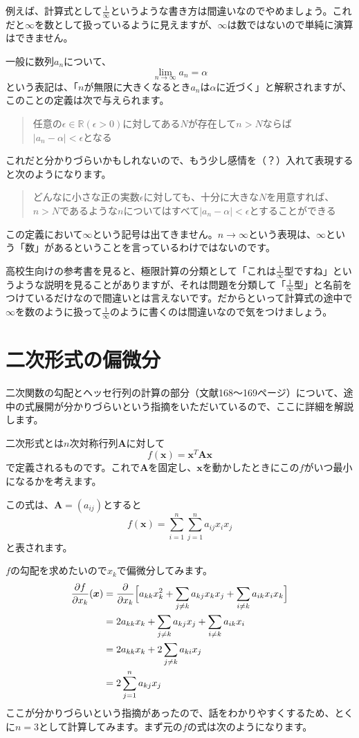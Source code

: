 \documentclass[11pt]{article}
\begin{document}
例えば、計算式として$\frac{1}{\infty}$というような書き方は間違いなのでやめましょう。これだと$\infty$を数として扱っているように見えますが、$\infty$は数ではないので単純に演算はできません。

一般に数列$a_n$について、
\[
\lim_{n\to \infty} a_n = \alpha
\]
という表記は、「$n$が無限に大きくなるとき$a_n$は$\alpha$に近づく」と解釈されますが、このことの定義は次で与えられます。

\begin{quote}
  任意の$\epsilon \in \mathbb{R}(\epsilon >0)$に対してある$N$が存在して$n>N$ならば\\$|a_n - \alpha|<\epsilon$となる
\end{quote}

これだと分かりづらいかもしれないので、もう少し感情を（？）入れて表現すると次のようになります。
\begin{quote}
  どんなに小さな正の実数$\epsilon$に対しても、十分に大きな$N$を用意すれば、$n>N$であるような$n$についてはすべて$|a_n - \alpha|<\epsilon$とすることができる
\end{quote}

この定義において$\infty$という記号は出てきません。$n\to \infty$という表現は、$\infty$という「数」があるということを言っているわけではないのです。

高校生向けの参考書を見ると、極限計算の分類として「これは$\frac{1}{\infty}$型ですね」というような説明を見ることがありますが、それは問題を分類して「$\frac{1}{\infty}$型」と名前をつけているだけなので間違いとは言えないです。だからといって計算式の途中で$\infty$を数のように扱って$\frac{1}{\infty}$のように書くのは間違いなので気をつけましょう。

\section{二次形式の偏微分}

二次関数の勾配とヘッセ行列の計算の部分（文献\cite{mle}168〜169ページ）について、途中の式展開が分かりづらいという指摘をいただいているので、ここに詳細を解説します。

二次形式とは$n$次対称行列$\bm{A}$に対して
\[
f(\bm{x})=\bm{x}^T \bm{A} \bm{x}
\]
で定義されるものです。これで$\bm{A}$を固定し、$\bm{x}$を動かしたときにこの$f$がいつ最小になるかを考えます。

この式は、$\bm{A}=(a_{ij})$とすると
\[
f(\bm{x})=\sum_{i=1}^n \sum_{j=1}^n a_{ij} x_i x_j
\]
と表されます。

$f$の勾配を求めたいので$x_k$で偏微分してみます。
\begin{align}
\frac{\partial f}{\partial x_k}(\bm{x})
&=
\frac{\partial}{\partial x_k}\Bigl[
a_{kk} x_k^2
+\sum_{j\neq k} a_{kj}x_k x_j
+\sum_{i\neq k} a_{ik}x_i x_k
\Bigr]\notag\\
&=
2 a_{kk} x_k
+\sum_{j\neq k} a_{kj} x_j
+\sum_{i\neq k} a_{ik} x_i \notag\\
&=
2 a_{kk} x_k
+ 2 \sum_{j\neq k} a_{ki} x_j\notag\\
&=
2 \sum_{j=1}^n a_{kj} x_j \label{eq:grad-quad}
\end{align}
ここが分かりづらいという指摘があったので、話をわかりやすくするため、とくに$n=3$として計算してみます。まず元の$f$の式は次のようになります。
\end{document}
